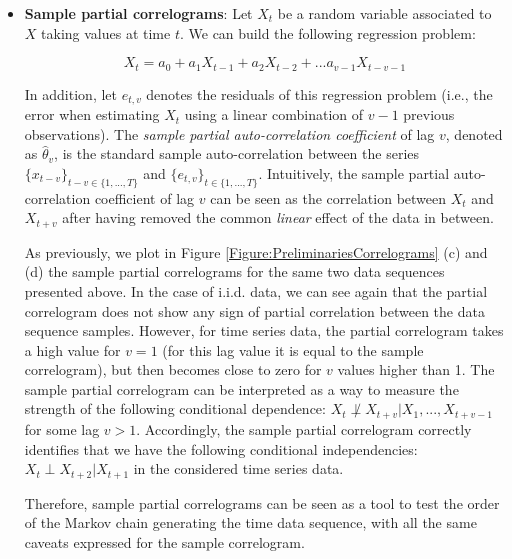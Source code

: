 \begin{itemize}
\item \textbf{Sample partial correlograms}: Let $X_t$ be a random variable associated to $X$ taking values at time $t$. We can build the following regression problem:

$$ X_t = a_0 + a_1X_{t-1} + a_2X_{t-2} + ... a_{v-1}X_{t-v-1}$$

In addition, let $e_{t,v}$ denotes the residuals of this regression problem (i.e., the error when estimating $X_t$ using a linear combination of $v-1$ previous observations). The \emph{sample partial auto-correlation coefficient} of lag $v$, denoted as  $\hat{\theta}_v$, is the standard sample auto-correlation between the series $\{x_{t-v}\}_{t-v\in\{1,...,T\}}$ and $\{e_{t,v}\}_{t\in\{1,...,T\}}$. Intuitively, the sample partial auto-correlation coefficient of lag $v$ can be seen as the correlation between $X_t$ and $X_{t+v}$ after having removed the common \emph{linear} effect of the data in between.

As previously, we plot in Figure \ref{Figure:PreliminariesCorrelograms} (c) and (d) the sample partial correlograms for the same two data sequences presented above. In the case of i.i.d. data, we can see again that the partial correlogram does not show any sign of partial correlation between the data sequence samples. However, for time series data, the partial correlogram takes a high value for $v=1$ (for this lag value it is equal to the sample correlogram), but then becomes close to zero for $v$ values higher than 1. The sample partial correlogram can be interpreted as a way to measure the strength of the following conditional dependence: $X_t  \not\perp X_{t+v} | X_1,...,X_{t+v-1}$ for some lag $v>1$. Accordingly, the sample partial correlogram correctly identifies that we have the following conditional independencies: $X_t\perp X_{t+2}|X_{t+1}$ in the considered time series data. 

Therefore, sample partial correlograms can be seen as a tool to test the order of the Markov chain generating the time data sequence, with all the same caveats expressed for the sample correlogram. 


\end{itemize}
